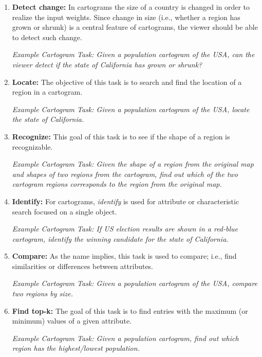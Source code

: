 \documentclass{egpubl}
\begin{document}
\begin{enumerate}[1.]
\item \textbf{Detect change:} 
In cartograms the size of a country is changed in order to realize the input weights. Since change in size (i.e., whether a region has grown or shrunk) is a central feature of cartograms, the viewer should be able to detect such change. 


\textit{Example Cartogram Task: Given a population cartogram of the USA, can the viewer detect if the state of California has grown or shrunk?}

\item \textbf{Locate:} The objective of this task is to search and find the location of a region in a cartogram.



\textit{Example Cartogram Task: Given a population cartogram of the USA, locate the state of California.}

\item \textbf{Recognize:} This goal of this task is to see if the shape of a region is recognizable.



\textit{Example Cartogram Task: Given the shape of a region from the original map and shapes of two regions from the cartogram, find out which of the two cartogram regions corresponds to the region from the original map.}

\item \textbf{Identify:}
For cartograms, \textit{identify} is used for attribute or characteristic search focused on a single object.

\textit{Example Cartogram Task:  If US election results are shown in a red-blue cartogram, identify the winning candidate for the state of California.}

\item \textbf{Compare:}
As the name implies, this task is used to compare; i.e., find similarities or differences between attributes.


\textit{Example Cartogram Task:  Given a population cartogram of the USA, compare two regions by size.}


\item \textbf{Find top-k:}
 The goal of this task is to find  entries with the maximum
 (or minimum) values of a given attribute.

\textit{Example Cartogram Task: Given a population cartogram, find out which region has the highest/lowest population. }



\end{enumerate}
\end{document}
